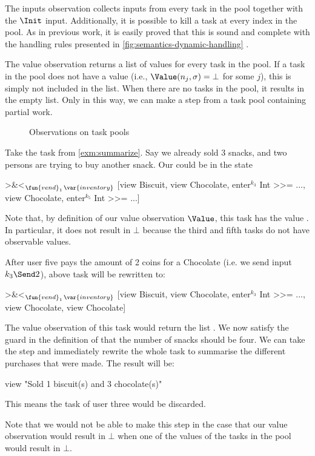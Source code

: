 The inputs observation collects inputs from every task in the pool
together with the $\Init$ input.
Additionally, it is possible to kill a task at every index in the pool.
As in previous work, it is easily proved that this is sound and complete with the handling rules presented in \cref{fig:semantics-dynamic-handling} \cite{Steenvoorden22}.

The value observation returns a list of values for every task in the pool.
If a task in the pool does not have a value (i.e., $\Value(n_j,\sigma) = \bot$ for some $j$),
this is simply not included in the list.
When there are no tasks in the pool, it results in the empty list.
Only in this way,
we can make a step from a task pool containing partial work.

\begin{figure}
  \caption{Observations on task pools}
  \label{fig:observations-dynamic}
\end{figure}

\begin{example}
  \label{exm:partial-work}
  Take the  task from \cref{exm:summarize}.
  Say we already sold 3 snacks, and two persons are trying to buy another snack.
  Our  could be in the state
  \begin{TASK}
    >&<$_{\fun{vend}_1\,\var{inventory}}$ [view Biscuit, view Chocolate,
      enter$^{k_3}$ Int >>= ..., view Chocolate, enter$^{k_5}$ Int >>= ...]
  \end{TASK}
  Note that, by definition of our value observation $\Value$,
  this task has the value .
  In particular, it does not result in $\bot$ because the third and fifth tasks do not have observable values.

  After user five pays the amount of 2 coins for a Chocolate (i.e. we send input $k_3\Send2$),
  above task will be rewritten to:
  \begin{TASK}
    >&<$_{\fun{vend}_1\,\var{inventory}}$ [view Biscuit, view Chocolate,
      enter$^{k_3}$ Int >>= ..., view Chocolate, view Chocolate]
  \end{TASK}
  The value observation of this task would return the list .
  We now satisfy the guard in the definition of  that the number of snacks should be four.
  We can take the step and immediately rewrite the whole task to summarise the different purchases that were made.
  The result will be:
  \begin{TASK}
    view "Sold 1 biscuit(s) and 3 chocolate(s)"
  \end{TASK}
  This means the  task of user three would be discarded.

  Note that we would not be able to make this step in the case that our value observation would result in $\bot$ when one of the values of the tasks in the pool would result in $\bot$.
\end{example}